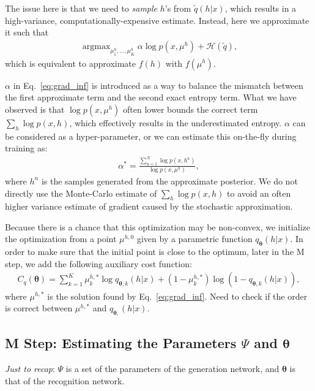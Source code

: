 \documentclass{article}
\newcommand{\vects}[1]{\boldsymbol{#1}}
\newcommand{\TT}[0]{\vects{\theta}}
\newcommand{\HH}[0]{\mathcal{H}}
\DeclareMathOperator*{\argmax}{\arg \max}
\begin{document}
The issue here is that we need to {\em sample} $h$'s from $\tilde{q}(h|x)$,
which results in a high-variance, computationally-expensive estimate. Instead,
here we approximate it such that
\begin{align}
    \label{eq:grad_inf}
    \argmax_{\mu^h_1, \ldots, \mu^h_K} 
    \alpha \log p(x,\mu^h) + \HH(\tilde{q}),
\end{align}
which is equivalent to approximate $f(h)$ with $f(\mu^h)$. 

$\alpha$ in Eq.~\eqref{eq:grad_inf} is introduced as a way to balance the
mismatch between the first approximate term and the second exact entropy term.
What we have observed is that $\log p(x, \mu^h)$ often lower bounds the correct
term $\sum_h \log p(x, h)$, which effectively results in the underestimated
entropy. $\alpha$ can be considered as a hyper-parameter, or we can estimate
this on-the-fly during training as:
\begin{align*}
    \alpha^* = \frac{\sum_{n=1}^N \log p(x, h^n)}{\log p(x, \mu^h)},
\end{align*}
where $h^n$ is the samples generated from the approximate posterior.  We do not
directly use the Monte-Carlo estimate of $\sum_h \log p(x, h)$ to avoid an
often higher variance estimate of gradient caused by the stochastic
approximation.

Because there is a chance that this optimization may be non-convex, we
initialize the optimization from a point $\mu^{h,0}$ given by a parametric
function $q_{\TT}(h|x)$. In order to make sure that the initial point is close
to the optimum, later in the M step, we add the following auxiliary cost
function:
\begin{align}
    \label{eq:c_q}
    C_q(\TT) = \sum_{k=1}^K \mu^{h,*}_k\log q_{\TT,k}(h|x) + 
    (1 - \mu^{h,*}_k)\log (1 - q_{\TT,k}(h|x)),
\end{align}
where $\mu^{h,*}$ is the solution found by Eq.~\eqref{eq:grad_inf}. {\color{red}
    Need to check if the order is correct between $\mu^{h,*}$ and
$q_{\TT,}(h|x)$.}

\subsection{M Step: Estimating the Parameters $\Psi$ and $\TT$}

{\em Just to recap}: $\Psi$ is a set of the parameters of the generation
network, and $\TT$ is that of the recognition network.
\end{document}
